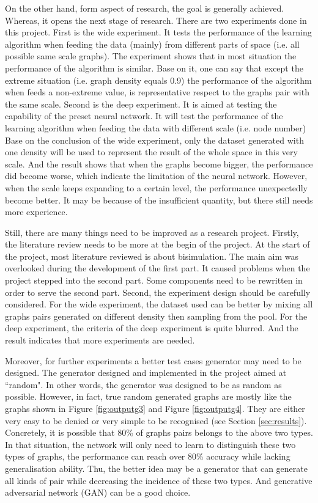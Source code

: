 On the other hand, form aspect of research, the goal is generally achieved.
Whereas, it opens the next stage of research.
There are two experiments done in this project.
First is the wide experiment. 
It tests the performance of the learning algorithm when feeding the data (mainly) from different parts of space (i.e. all possible same scale graphs).
The experiment shows that in most situation the performance of the algorithm is similar.
Base on it, one can say that except the extreme situation (i.e. graph density equals 0.9) the performance of the algorithm when feeds a non-extreme value, is representative respect to the graphs pair with the same scale.
Second is the deep experiment.
It is aimed at testing the capability of the preset neural network.
It will test the performance of the learning algorithm when feeding the data with different scale (i.e. node number)
Base on the conclusion of the wide experiment, only the dataset generated with one density will be used to represent the result of the whole space in this very scale.
And the result shows that when the graphs become bigger, the performance did become worse,
which indicate the limitation of the neural network.
However, when the scale keeps expanding to a certain level, the performance unexpectedly become better.
It may be because of the insufficient quantity, but there still needs more experience.

Still, there are many things need to be improved as a research project.
Firstly, the literature review needs to be more at the begin of the project.
At the start of the project, most literature reviewed is about bisimulation.
The main aim was overlooked during the development of the first part.
It caused problems when the project stepped into the second part.
Some components need to be rewritten in order to serve the second part.
Second, the experiment design should be carefully considered.
For the wide experiment, the dataset used can be better by mixing all graphs pairs generated on different density then sampling from the pool.
For the deep experiment, the criteria of the deep experiment is quite blurred.
And the result indicates that more experiments are needed.

Moreover, for further experiments a better test cases generator may need to be designed.
The generator designed and implemented in the project aimed at ``random".
In other words, the generator was designed to be as random as possible.
However, in fact, true random generated graphs are mostly like the graphs shown in Figure \ref{fig:outputg3} and Figure \ref{fig:outputg4}.
They are either very easy to be denied or very simple to be recognised (see Section \ref{sec:results}).
Concretely, it is possible that 80\% of graphs pairs belongs to the above two types.
In that situation, the network will only need to learn to distinguish these two types of graphs, the performance can reach over 80\% accuracy while lacking generalisation ability.
Thu, the better idea may be a generator that can generate all kinds of pair while decreasing the incidence of these two types.
And generative adversarial network (GAN) can be a good choice.

